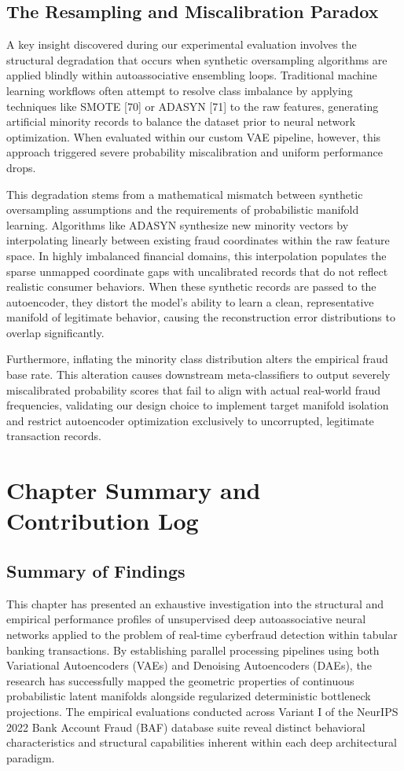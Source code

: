 \documentclass[11pt,a4paper]{report}
\begin{document}
\subsection{The Resampling and Miscalibration Paradox}
A key insight discovered during our experimental evaluation involves the structural degradation that occurs when synthetic oversampling algorithms are applied blindly within autoassociative ensembling loops. Traditional machine learning workflows often attempt to resolve class imbalance by applying techniques like SMOTE [70] or ADASYN [71] to the raw features, generating artificial minority records to balance the dataset prior to neural network optimization. When evaluated within our custom VAE pipeline, however, this approach triggered severe probability miscalibration and uniform performance drops. 

This degradation stems from a mathematical mismatch between synthetic oversampling assumptions and the requirements of probabilistic manifold learning. Algorithms like ADASYN synthesize new minority vectors by interpolating linearly between existing fraud coordinates within the raw feature space. In highly imbalanced financial domains, this interpolation populates the sparse unmapped coordinate gaps with uncalibrated records that do not reflect realistic consumer behaviors. When these synthetic records are passed to the autoencoder, they distort the model's ability to learn a clean, representative manifold of legitimate behavior, causing the reconstruction error distributions to overlap significantly. 

Furthermore, inflating the minority class distribution alters the empirical fraud base rate. This alteration causes downstream meta-classifiers to output severely miscalibrated probability scores that fail to align with actual real-world fraud frequencies, validating our design choice to implement target manifold isolation and restrict autoencoder optimization exclusively to uncorrupted, legitimate transaction records.

\section{Chapter Summary and Contribution Log}

\subsection{Summary of Findings}
This chapter has presented an exhaustive investigation into the structural and empirical performance profiles of unsupervised deep autoassociative neural networks applied to the problem of real-time cyberfraud detection within tabular banking transactions. By establishing parallel processing pipelines using both Variational Autoencoders (VAEs) and Denoising Autoencoders (DAEs), the research has successfully mapped the geometric properties of continuous probabilistic latent manifolds alongside regularized deterministic bottleneck projections. The empirical evaluations conducted across Variant I of the NeurIPS 2022 Bank Account Fraud (BAF) database suite reveal distinct behavioral characteristics and structural capabilities inherent within each deep architectural paradigm. 
\end{document}
